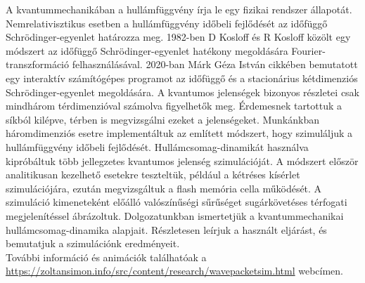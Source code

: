 A kvantummechanikában a hullámfüggvény írja le egy fizikai rendszer állapotát. Nemrelativisztikus esetben a hullámfüggvény időbeli fejlődését az időfüggő Schrödinger-egyenlet határozza meg. 1982-ben D Kosloff és R Kosloff közölt egy módszert \cite{KOSLOFF198335} az időfüggő Schrödinger-egyenlet hatékony megoldására Fourier-transzformáció felhasználásával. 2020-ban Márk Géza István cikkében \cite{mark2020webschrodinger} bemutatott egy interaktív szá\-mí\-tó\-gé\-pes programot az időfüggő és a stacionárius kétdimenziós Schrödinger-egyenlet megoldására. A kvantumos jelenségek bizonyos részletei csak mindhárom térdimenzióval számolva figyelhetők meg. Érdemesnek tartottuk a síkból kilépve, térben is megvizsgálni ezeket a jelenségeket. Munkánkban háromdimenziós esetre implementáltuk az említett módszert, hogy szimuláljuk a hullámfüggvény időbeli fejlődését. Hullámcsomag-dinamikát használva kipróbáltuk több jellegzetes kvantumos jelenség szimulációját. A módszert először analitikusan kezelhető esetekre teszteltük, például a kétréses kísérlet szimulációjára, ezután megvizsgáltuk a flash memória cella működését. A szimuláció kimeneteként előálló valószínűségi sűrűséget sugárkövetéses térfogati megjelenítéssel ábrázoltuk. Dolgozatunkban ismertetjük a kvantummechanikai hullámcsomag-dinamika alapjait. Részletesen leírjuk a használt eljárást, és bemutatjuk a szimulációnk eredményeit.\\
További információ és animációk találhatóak a\\ \url{https://zoltansimon.info/src/content/research/wavepacketsim.html} webcímen.

